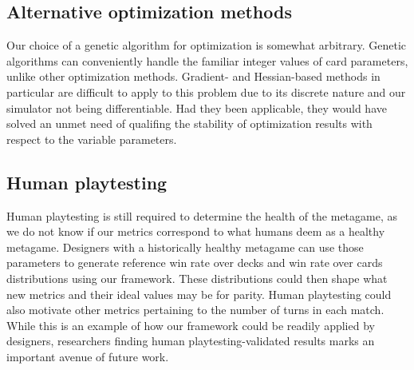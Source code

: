 

\subsection{Alternative optimization methods}

Our choice of a genetic algorithm for optimization is somewhat arbitrary. Genetic algorithms can conveniently 
handle the familiar integer values of card parameters, unlike other optimization methods. Gradient- and Hessian-based
methods in particular are difficult to apply to this problem due to its discrete nature and our simulator not being
differentiable. Had they been applicable, they would have solved an unmet need of qualifing the stability of optimization
results with respect to the variable parameters.

\subsection{Human playtesting}

Human playtesting is still required to determine the health of the metagame, as we do not know if our metrics
correspond to what humans deem as a healthy metagame. Designers
with a historically healthy metagame can use those parameters to generate reference win rate 
over decks and win rate over cards distributions using our framework. These distributions could then shape 
what new metrics and their ideal values may be for parity. Human playtesting could also motivate other metrics pertaining
to the number of turns in each match. While this is an example of how our framework
could be readily applied by designers, researchers finding human playtesting-validated results marks an important avenue of 
future work.

